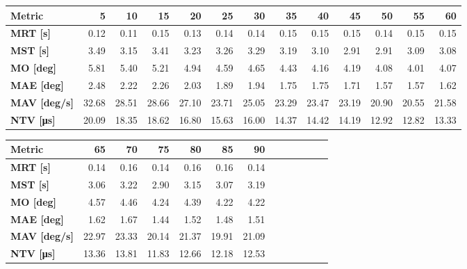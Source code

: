 \begin{tabular*}{\textwidth}{@{\extracolsep{\fill}}l|rrrrrrrrrrrr}
    \toprule
    \textbf{Metric} & \textbf{5} & \textbf{10} & \textbf{15} & \textbf{20} & \textbf{25} & \textbf{30} & \textbf{35} & \textbf{40} & \textbf{45} & \textbf{50} & \textbf{55} & \textbf{60} \\
    \midrule
    \textbf{MRT [s]} & 0.12 & 0.11 & 0.15 & 0.13 & 0.14 & 0.14 & 0.15 & 0.15 & 0.15 & 0.14 & 0.15 & 0.15 \\
    \textbf{MST [s]} & 3.49 & 3.15 & 3.41 & 3.23 & 3.26 & 3.29 & 3.19 & 3.10 & 2.91 & 2.91 & 3.09 & 3.08 \\
    \textbf{MO  [deg]} & 5.81 & 5.40 & 5.21 & 4.94 & 4.59 & 4.65 & 4.43 & 4.16 & 4.19 & 4.08 & 4.01 & 4.07 \\
    \textbf{MAE [deg]} & 2.48 & 2.22 & 2.26 & 2.03 & 1.89 & 1.94 & 1.75 & 1.75 & 1.71 & 1.57 & 1.57 & 1.62 \\
    \textbf{MAV [deg/s]} & 32.68 & 28.51 & 28.66 & 27.10 & 23.71 & 25.05 & 23.29 & 23.47 & 23.19 & 20.90 & 20.55 & 21.58 \\
    \textbf{NTV [\si{\micro\second}]} & 20.09 & 18.35 & 18.62 & 16.80 & 15.63 & 16.00 & 14.37 & 14.42 & 14.19 & 12.92 & 12.82 & 13.33 \\
    \bottomrule
\end{tabular*}

\begin{tabular*}{\textwidth}{@{\extracolsep{\fill}}l|rrrrrrrrrrrr}
    \toprule
    \textbf{Metric} & \textbf{65} & \textbf{70} & \textbf{75} & \textbf{80} & \textbf{85} & \textbf{90} &&&&&&\\
    \midrule
    \textbf{MRT [s]} & 0.14 & 0.16 & 0.14 & 0.16 & 0.16 & 0.14 &&&&&&\\
    \textbf{MST [s]} & 3.06 & 3.22 & 2.90 & 3.15 & 3.07 & 3.19 &&&&&&\\
    \textbf{MO  [deg]} & 4.57 & 4.46 & 4.24 & 4.39 & 4.22 & 4.22 &&&&&&\\
    \textbf{MAE [deg]} & 1.62 & 1.67 & 1.44 & 1.52 & 1.48 & 1.51 &&&&&&\\
    \textbf{MAV [deg/s]} & 22.97 & 23.33 & 20.14 & 21.37 & 19.91 & 21.09 &&&&&&\\
    \textbf{NTV [\si{\micro\second}]} & 13.36 & 13.81 & 11.83 & 12.66 & 12.18 & 12.53 &&&&&&\\
    \bottomrule
\end{tabular*}

